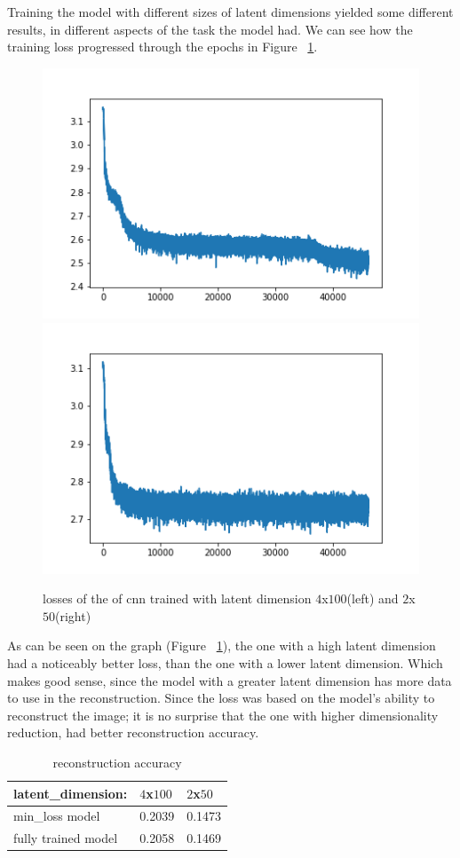 Training the model with different sizes of latent dimensions yielded some different results, in different aspects of the task the model had. We can see how the training loss progressed through the epochs in Figure ~\ref{fig:cnn_loss}.\\

\begin{figure}[!ht]
  \centering
  \includegraphics[width=0.4\linewidth]{latex/imgs/CNN_loss_latent_dimension_100.png}
  \includegraphics[width=0.4\linewidth]{latex/imgs/loss_latent_dimension_50.png}
  \caption{losses of the of cnn trained with latent dimension $4$x$100$(left) and $2$x$50$(right)}
  \label{fig:cnn_loss}
\end{figure}

\noindent
As can be seen on the graph (Figure ~\ref{fig:cnn_loss}), the one with a high latent dimension had a noticeably better loss, than the one with a lower latent dimension. Which makes good sense, since the model with a greater latent dimension has more data to use in the reconstruction. Since the loss was based on the model's ability to reconstruct the image; it is no surprise that the one with higher dimensionality reduction, had better reconstruction accuracy.

\begin{table}[!ht]
\centering
\begin{tabular}{|l|l|l|}
\hline
 latent\_dimension: & $4$x$100$  &  $2$x$50$ \\ \hline
min\_loss model     & 0.2039 & 0.1473 \\ \hline
fully trained model & 0.2058 & 0.1469 \\ \hline
\end{tabular}
\caption{reconstruction accuracy}
\end{table}

